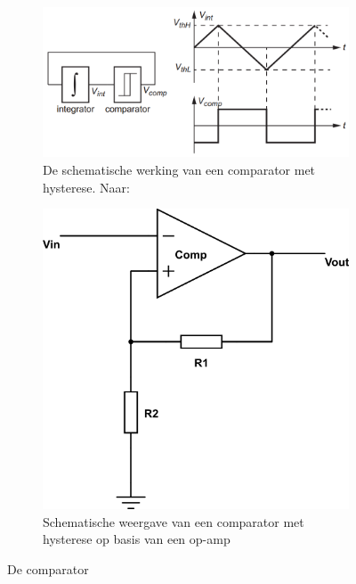 \documentclass{report}
\begin{document}
\begin{figure}[H]
	\centering
	\begin{subfigure}{0.5\textwidth}
		\centering
		\includegraphics[width=\textwidth]{comparator-werking.png}
		\caption{De schematische werking van een comparator met hysterese. Naar: \cite{epo2-opamps}}
		\label{fig:comp-werk}
	\end{subfigure}
	\begin{subfigure}{0.4\textwidth}
		\centering
		\includegraphics[width=\textwidth]{comparator.png}
		\caption{Schematische weergave van een comparator met hysterese op basis van een op-amp}
		\label{fig:comp-schem}
	\end{subfigure}
	\caption{De comparator}
	\label{fig:comp}
\end{figure}
\end{document}
